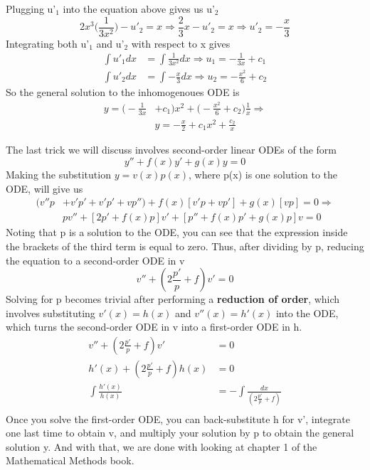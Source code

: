 \documentclass{article}
\newcommand{\be}{\begin{equation}}
\newcommand{\ee}{\end{equation}}
\begin{document}
Plugging u'$_1$ into the equation above gives us u'$_2$
\be
2x^3 \Big( \frac{1}{3x^2} \Big) - u'_2 = x \Rightarrow \frac{2}{3}x - u'_2 = x \Rightarrow u'_2 = - \frac{x}{3}
\ee
Integrating both u'$_1$ and u'$_2$ with respect to x gives
\be
\begin{split}
  \int u'_1 dx &= \int \frac{1}{3x^2} dx \Rightarrow u_1 = - \frac{1}{3x} + c_1 \\
  \int u'_2 dx &= \int - \frac{x}{3} dx \Rightarrow u_2 = - \frac{x^2}{6} + c_2
\end{split}
\ee
So the general solution to the inhomogenoues ODE is
\be
\begin{split}
y = \Big( - \frac{1}{3x} & + c_1 \Big) x^2 + \Big( - \frac{x^2}{6} + c_2 \Big) \frac{1}{x} \Rightarrow \\
& y = - \frac{x}{2} + c_1 x^2 + \frac{c_2}{x}
\end{split}
\ee

The last trick we will discuss involves second-order linear ODEs of the form
\be
y'' + f(x)y' + g(x)y = 0
\ee
Making the substitution $y = v(x)p(x)$, where p(x) is one solution to the ODE, will give us
\be
\begin{split}
(v''p & + v'p' + v'p' + vp'') + f(x)[v'p + vp'] + g(x)[vp] = 0 \Rightarrow \\
& pv'' + [2p' + f(x)p]v' + [p'' + f(x)p' + g(x)p]v = 0
\end{split}
\ee
Noting that p is a solution to the ODE, you can see that the expression inside the brackets of the third term is equal to zero.
Thus, after dividing by p, reducing the equation to a second-order ODE in v
\be
v'' + (2 \frac{p'}{p} + f)v' = 0
\ee
Solving for p becomes trivial after performing a \textbf{reduction of order}, which involves substituting $v'(x) = h(x)$ and $v''(x) = h'(x)$ into the ODE, which turns the second-order ODE in v into a first-order ODE in h.
\be
\begin{split}
    v'' + (2 \frac{p'}{p} + f)v' &= 0\\
    h'(x) + (2 \frac{p'}{p} + f)h(x) &= 0\\
    \int \frac{h'(x)}{h(x)} &= -\int \frac{dx}{(2 \frac{p'}{p} + f)}\\
\end{split}
\ee
Once you solve the first-order ODE, you can back-substitute h for v', integrate one last time to obtain v, and multiply your solution by p to obtain the general solution y.
And with that, we are done with looking at chapter 1 of the Mathematical Methods book.
\end{document}
